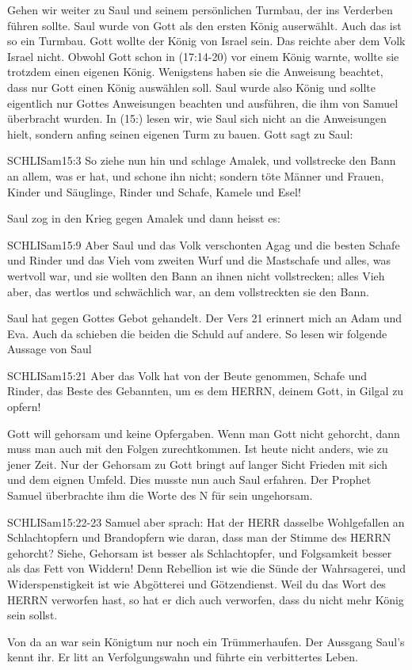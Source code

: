 \documentclass[fontsize=16pt]{mybib}
\begin{document}
\begin{otsblock}
    Gehen wir weiter zu Saul und seinem persönlichen Turmbau, der ins Verderben führen sollte. Saul wurde von Gott als den ersten König auserwählt. Auch das ist so ein Turmbau. Gott wollte der König von Israel sein. Das reichte aber dem Volk Israel nicht. Obwohl Gott schon in (17:14-20) vor einem König warnte, wollte sie trotzdem einen eigenen König. Wenigstens haben sie die Anweisung beachtet, dass nur Gott einen König auswählen soll. Saul wurde also König und sollte eigentlich nur Gottes Anweisungen beachten und ausführen, die ihm von Samuel überbracht wurden. In (15:) lesen wir, wie Saul sich nicht an die Anweisungen hielt, sondern anfing seinen eigenen Turm zu bauen. Gott sagt zu Saul:
    \begin{bibelbox}{SCHL}{ISam}{15:3}
        So ziehe nun hin und schlage Amalek, und vollstrecke den Bann an allem, was er hat, und schone ihn nicht; sondern töte Männer und Frauen, Kinder und Säuglinge, Rinder und Schafe, Kamele und Esel!
    \end{bibelbox}
    Saul zog in den Krieg gegen Amalek und dann heisst es:
    \begin{bibelbox}{SCHL}{ISam}{15:9}
        Aber Saul und das Volk verschonten Agag und die besten Schafe und Rinder und das Vieh vom zweiten Wurf und die Mastschafe und alles, was wertvoll war, und sie wollten den Bann an ihnen nicht vollstrecken; alles Vieh aber, das wertlos und schwächlich war, an dem vollstreckten sie den Bann.
    \end{bibelbox}
    Saul hat gegen Gottes Gebot gehandelt. Der Vers 21 erinnert mich an Adam und Eva. Auch da schieben die beiden die Schuld auf andere. So lesen wir folgende Aussage von Saul
    \begin{bibelbox}{SCHL}{ISam}{15:21}
        Aber das Volk hat von der Beute genommen, Schafe und Rinder, das Beste des Gebannten, um es dem HERRN, deinem Gott, in Gilgal zu opfern!
    \end{bibelbox}
    Gott will gehorsam und keine Opfergaben. Wenn man Gott nicht gehorcht, dann muss man auch mit den Folgen zurechtkommen. Ist heute nicht anders, wie zu jener Zeit. Nur der Gehorsam zu Gott bringt auf langer Sicht Frieden mit sich und dem eignen Umfeld. Dies musste nun auch Saul erfahren. Der Prophet Samuel überbrachte ihm die Worte des \herr N für sein ungehorsam.    
    \begin{bibelbox}{SCHL}{ISam}{15:22-23}
        Samuel aber sprach: Hat der HERR dasselbe Wohlgefallen an Schlachtopfern und Brandopfern wie daran, dass man der Stimme des HERRN gehorcht? Siehe, Gehorsam ist besser als Schlachtopfer, und Folgsamkeit besser als das Fett von Widdern! Denn Rebellion ist wie die Sünde der Wahrsagerei, und Widerspenstigkeit ist wie Abgötterei und Götzendienst. Weil du das Wort des HERRN verworfen hast, so hat er dich auch verworfen, dass du nicht mehr König sein sollst.
    \end{bibelbox} 
    Von da an war sein Königtum nur noch ein Trümmerhaufen. Der Aussgang Saul's kennt ihr. Er litt an Verfolgungswahn und führte ein verbittertes Leben.
\end{otsblock}
\end{document}
